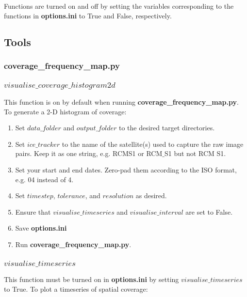 \documentclass[12pt]{article}
\begin{document}
Functions are turned on and off by setting the variables corresponding to the functions in \textbf{options.ini} to True and False, respectively.

\subsection*{Tools}

\subsubsection*{\textbf{coverage\_frequency\_map.py}}

\subsubsection*{$visualise\_coverage\_histogram2d$}

This function is on by default when running \textbf{coverage\_frequency\_map.py}. To generate a 2-D histogram of coverage:

\begin{enumerate}
    \item Set $data\_folder$ and $output\_folder$ to the desired target directories.
    \item Set $ice\_tracker$ to the name of the satellite(s) used to capture the raw image pairs. Keep it as one string, e.g. RCMS1 or RCM$\_$S1 but not RCM S1.
    \item Set your start and end dates. Zero-pad them according to the ISO format, e.g. 04 instead of 4.
    \item Set $timestep$, $tolerance$, and $resolution$ as desired.
    \item Ensure that $visualise\_timeseries$ and $visualise\_interval$ are set to False.
    \item Save \textbf{options.ini}
    \item Run \textbf{coverage\_frequency\_map.py}.
\end{enumerate}

\subsubsection*{$visualise\_timeseries$}

This function must be turned on in \textbf{options.ini} by setting $visualise\_timeseries$ to True. To plot a timeseries of spatial coverage:
\end{document}
